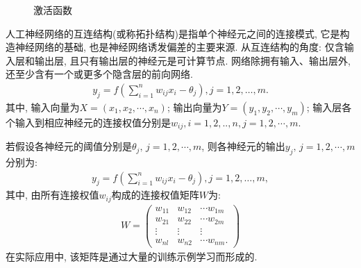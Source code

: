\begin{figure}[H]
\begin{center}
\caption{激活函数}
\label{AI32fig2604}
\end{center}
\end{figure}
人工神经网络的互连结构(或称拓扑结构)是指单个神经元之间的连接模式, 它是构造神经网络的基础, 也是神经网络诱发偏差的主要来源. 从互连结构的角度:
仅含输入层和输出层, 且只有输出层的神经元是可计算节点. 网络除拥有输入、输出层外, 还至少含有一个或更多个隐含层的前向网络.
\begin{align}
    {y}_{{j}}={f}\left(\sum_{{i}=1}^{{n}} w_{{ij}} {x}_{{i}}-\theta_{{j}}\right), {j}=1,2, \ldots, {m}.
\end{align}
其中, 输入向量为$X=(x_1,x_2,\cdots,x_n)$; 输出向量为$Y=(y_1,y_2,\cdots,y_m)$; 输入层各个输入到相应神经元的连接权值分别是$w_{ij}, i=1,2,..,n, j=1,2,\cdots, m$.

若假设各神经元的阈值分别是$\theta_j,\, j=1,2,\cdots,m$, 则各神经元的输出$y_j,\, j=1,2, \cdots, m$分别为:
\begin{align}
    {y}_{{j}}={f}\left(\sum_{{i}=1}^{{n}} w_{{ij}} {x}_{{i}}-\theta_{{j}}\right), {j}=1,2, \ldots, {m},
\end{align}
其中, 由所有连接权值$w_{ij}$构成的连接权值矩阵$W$为:
\begin{align}
    W=\left(
  \begin{array}{ccc}
  {w_{11}} & {w_{12}} & {\cdots w_{1 {m}}} \\
  {w_{21}} & {w_{22}} & {\cdots w_{2 {m}}} \\
  {\vdots} & {\vdots} & {\vdots} \\ {w_{{nl}}} & {w_{{n} 2}} & \cdots w_{{nm}}.
  \end{array}
  \right)
\end{align}
在实际应用中, 该矩阵是通过大量的训练示例学习而形成的.
